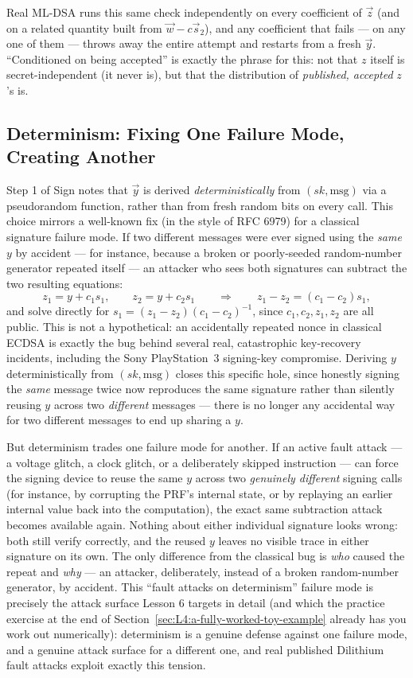Real ML-DSA runs this same check independently on every coefficient of $\vec z$ (and on a related quantity built from $\vec w - c\vec s_2$), and any coefficient that fails --- on any one of them --- throws away the entire attempt and restarts from a fresh $\vec y$. ``Conditioned on being accepted'' is exactly the phrase for this: not that $z$ itself is secret-independent (it never is), but that the distribution of \emph{published, accepted} $z$'s is.

\subsection{Determinism: Fixing One Failure Mode, Creating Another}
\label{sec:L4:determinism-fixing-one-failure-mode-crea}

Step 1 of Sign notes that $\vec y$ is derived \emph{deterministically} from $(sk,\text{msg})$ via a pseudorandom function, rather than from fresh random bits on every call. This choice mirrors a well-known fix (in the style of RFC 6979) for a classical signature failure mode. If two different messages were ever signed using the \emph{same} $y$ by accident --- for instance, because a broken or poorly-seeded random-number generator repeated itself --- an attacker who sees both signatures can subtract the two resulting equations:
$$
z_1 = y+c_1s_1, \qquad z_2 = y+c_2s_1 \qquad \Longrightarrow \qquad z_1-z_2 = (c_1-c_2)s_1,
$$
and solve directly for $s_1 = (z_1-z_2)(c_1-c_2)^{-1}$, since $c_1,c_2,z_1,z_2$ are all public. This is not a hypothetical: an accidentally repeated nonce in classical ECDSA is exactly the bug behind several real, catastrophic key-recovery incidents, including the Sony PlayStation~3 signing-key compromise. Deriving $y$ deterministically from $(sk,\text{msg})$ closes this specific hole, since honestly signing the \emph{same} message twice now reproduces the same signature rather than silently reusing $y$ across two \emph{different} messages --- there is no longer any accidental way for two different messages to end up sharing a $y$.

But determinism trades one failure mode for another. If an active fault attack --- a voltage glitch, a clock glitch, or a deliberately skipped instruction --- can force the signing device to reuse the same $y$ across two \emph{genuinely different} signing calls (for instance, by corrupting the PRF's internal state, or by replaying an earlier internal value back into the computation), the exact same subtraction attack becomes available again. Nothing about either individual signature looks wrong: both still verify correctly, and the reused $y$ leaves no visible trace in either signature on its own. The only difference from the classical bug is \emph{who} caused the repeat and \emph{why} --- an attacker, deliberately, instead of a broken random-number generator, by accident. This ``fault attacks on determinism'' failure mode is precisely the attack surface Lesson 6 targets in detail (and which the practice exercise at the end of Section~\ref{sec:L4:a-fully-worked-toy-example} already has you work out numerically): determinism is a genuine defense against one failure mode, and a genuine attack surface for a different one, and real published Dilithium fault attacks exploit exactly this tension.

